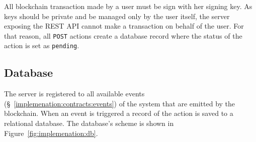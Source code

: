 All blockchain transaction made by a user must be sign with her signing key. As keys should be private and be managed only by the user itself, the server exposing the REST API cannot make a transaction on behalf of the user. For that reason, all \verb|POST| actions create a database record where the status of the action is set as \verb|pending|.

\subsection{Database}
\label{implemenation:api:db}

The server is registered to all available events (§~\ref{implemenation:contracts:events}) of the system that are emitted by the blockchain. When an event is triggered a record of the action is saved to a relational database. The database's scheme is shown in Figure~\ref{fig:implemenation:db}.

